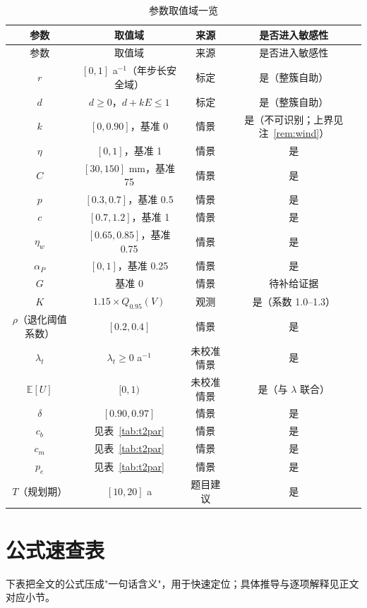 \documentclass[11pt,a4paper]{ctexart}
\newcommand{\E}{\mathbb{E}}
\begin{document}
\begingroup\small
\begin{longtable}{|c|c|c|c|}
\caption{参数取值域一览}\label{tab:parrange}\\
\hline
参数 & 取值域 & 来源 & 是否进入敏感性 \\
\hline
\endfirsthead
\hline
参数 & 取值域 & 来源 & 是否进入敏感性 \\
\hline
\endhead
$r$ & $[0,1]$ a$^{-1}$（年步长安全域） & 标定 & 是（整簇自助） \\
$d$ & $d\ge0$，$d+kE\le1$ & 标定 & 是（整簇自助） \\
$k$ & $[0,0.90]$，基准 0 & 情景 & 是（不可识别；上界见注~\ref{rem:wind}） \\
$\eta$ & $[0,1]$，基准 1 & 情景 & 是 \\
$C$ & $[30,150]$ mm，基准 75 & 情景 & 是 \\
$p$ & $[0.3,0.7]$，基准 0.5 & 情景 & 是 \\
$c$ & $[0.7,1.2]$，基准 1 & 情景 & 是 \\
$\eta_w$ & $[0.65,0.85]$，基准 0.75 & 情景 & 是 \\
$\alpha_P$ & $[0,1]$，基准 0.25 & 情景 & 是 \\
$G$ & 基准 0 & 情景 & 待补给证据 \\
$K$ & $1.15\times Q_{0.95}(V)$ & 观测 & 是（系数 1.0--1.3） \\
$\rho$（退化阈值系数） & $[0.2,0.4]$ & 情景 & 是 \\
$\lambda_t$ & $\lambda_t\ge0$ a$^{-1}$ & 未校准情景 & 是 \\
$\E[U]$ & $[0,1)$ & 未校准情景 & 是（与 $\lambda$ 联合） \\
$\delta$ & $[0.90,0.97]$ & 情景 & 是 \\
$c_b$ & 见表~\ref{tab:t2par} & 情景 & 是 \\
$c_m$ & 见表~\ref{tab:t2par} & 情景 & 是 \\
$p_e$ & 见表~\ref{tab:t2par} & 情景 & 是 \\
$T$（规划期） & $[10,20]$ a & 题目建议 & 是 \\
\hline
\end{longtable}
\endgroup

\section{公式速查表}\label{app:cheat}

下表把全文的公式压成"一句话含义"，用于快速定位；具体推导与逐项解释见正文对应小节。
\end{document}
